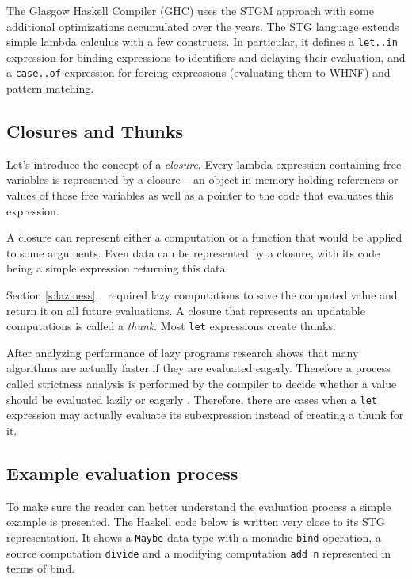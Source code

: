 \documentclass[en]{pracamgr}
\newcommand{\myref}[1]{\ref{#1}.~\textit{\nameref{#1}}}
\begin{document}
The Glasgow Haskell Compiler (GHC) uses the STGM approach with some additional
optimizations accumulated over the years.
The STG language extends simple lambda calculus with a few
constructs. In particular, it defines a \texttt{let..in} expression
for binding expressions to identifiers and delaying their evaluation,
and a \texttt{case..of} expression for forcing expressions (evaluating them to WHNF) and pattern matching.

\subsection{Closures and Thunks}\label{s:closures}

Let's introduce the concept of a \textit{closure}.
Every lambda expression containing free variables is represented by a closure --
an object in memory holding references or values of those free variables
as well as a pointer to the code that evaluates this expression.

A closure can represent either a computation or
a function that would be applied to some arguments.
Even data can be represented by a closure, with its code
being a simple expression returning this data.

Section \myref{s:laziness} required lazy computations to
save the computed value and return it on all future
evaluations. A closure that represents an updatable
computations is called a \textit{thunk}.
Most \texttt{let} expressions create thunks.

After analyzing performance of lazy programs research shows that
many algorithms are actually faster if they are evaluated eagerly.
Therefore a process called strictness analysis is
performed by the compiler to decide whether a value should be
evaluated lazily or eagerly \cite{demand analysis}.
Therefore, there are cases when a \texttt{let} expression
may actually evaluate its subexpression instead of creating a thunk for it.

\subsection{Example evaluation process}\label{s:example_eval}

To make sure the reader can better understand the
evaluation process a simple example is presented.
The Haskell code below is written very close to its STG representation.
It shows a \texttt{Maybe} data type with a monadic \texttt{bind} operation,
a source computation \texttt{divide} and a modifying
computation \texttt{add n} represented in terms of bind.
\end{document}
